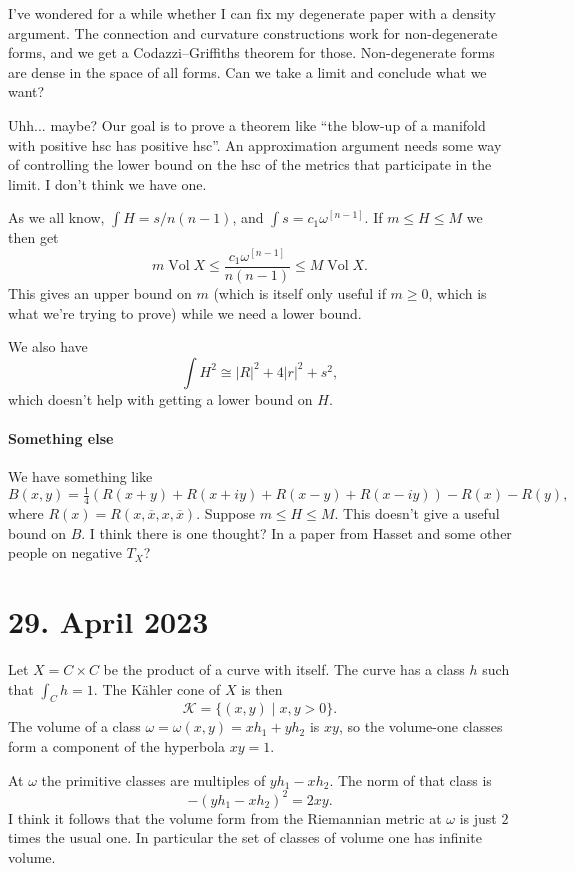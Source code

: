 \documentclass[11pt]{article}
\theoremstyle{definition}
\newcommand{\cc}[1]{\mathcal{#1}}
\def\^#1{^{[#1]}}
\def\ov#1{\overline{#1}}
\DeclareMathOperator{\Vol}{Vol}
\begin{document}
I've wondered for a while whether I can fix my degenerate paper with a density
argument.
The connection and curvature constructions work for non-degenerate forms, and
we get a Codazzi--Griffiths theorem for those.
Non-degenerate forms are dense in the space of all forms.
Can we take a limit and conclude what we want?

Uhh... maybe?
Our goal is to prove a theorem like ``the blow-up of a manifold with positive
hsc has positive hsc''.
An approximation argument needs some way of controlling the lower bound on the hsc of the metrics that participate in the limit.
I don't think we have one.

As we all know, $\int H = s/n(n-1)$, and $\int s = c_1 \omega\^{n-1}$.
If $m \leq H \leq M$ we then get
$$
m \Vol X \leq \frac{c_1 \omega\^{n-1}}{n(n-1)} \leq M \Vol X.
$$
This gives an upper bound on $m$ (which is itself only useful if $m \geq 0$,
which is what we're trying to prove) while we need a lower bound.

We also have
$$
\int H^2 \cong |R|^2 + 4|r|^2 + s^2,
$$
which doesn't help with getting a lower bound on $H$.



\paragraph{Something else}

We have something like
$$
B(x,y)
= \tfrac14(R(x + y) + R(x + iy) + R(x - y) + R(x - iy))
- R(x) - R(y),
$$
where $R(x) = R(x, \ov x, x, \ov x)$.
Suppose $m \leq H \leq M$.
This doesn't give a useful bound on $B$.
I think there is one thought? In a paper from Hasset and some other people on negative $T_X$?



\section{29. April 2023}

Let $X = C \times C$ be the product of a curve with itself.
The curve has a class $h$ such that $\int_C h = 1$.
The K\"ahler cone of $X$ is then
$$
\cc K
= \{ (x,y) \mid x, y > 0 \}.
$$
The volume of a class $\omega = \omega(x,y) = x h_1 + y h_2$ is $xy$,
so the volume-one classes form a component of the hyperbola $xy = 1$.

At $\omega$ the primitive classes are multiples of $yh_1 - xh_2$.
The norm of that class is
$$
- (yh_1 - xh_2)^2 = 2xy.
$$
I think it follows that the volume form from the Riemannian metric at $\omega$
is just $2$ times the usual one.
In particular the set of classes of volume one has infinite volume.
\end{document}

